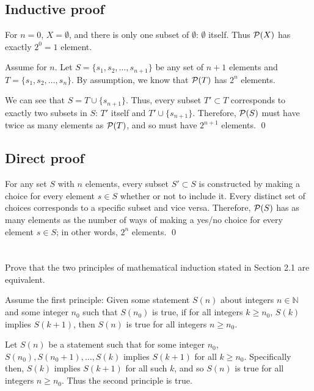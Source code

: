 \subsection{Inductive proof}\label{subsec:2-12-1}

For $n=0$, $X = \emptyset$, and there is only one subset of $\emptyset$: $\emptyset$ itself. Thus $\mathcal{P}(X)$ has exactly $2^0 = 1$ element.

\medskip

Assume for $n$. Let $S = \{s_1, s_2, \dots, s_{n+1}\}$ be any set of $n+1$ elements and $T = \{s_1, s_2, \dots, s_n\}$. By assumption, we know that $\mathcal{P}(T)$ has $2^n$ elements.

We can see that $S = T \cup \{s_{n+1}\}$. Thus, every subset $T' \subset T$ corresponds to exactly two subsets in $S$: $T'$ itself and $T' \cup \{s_{n+1}\}$. Therefore, $\mathcal{P}(S)$ must have twice as many elements as $\mathcal{P}(T)$, and so must have $2^{n+1}$ elements.
\qed

\subsection{Direct proof}\label{subsec:2-12-2}

For any set $S$ with $n$ elements, every subset $S' \subset S$ is constructed by making a choice for every element $s \in S$ whether or not to include it. Every distinct set of choices corresponds to a specific subset and vice versa. Therefore, $\mathcal{P}(S)$ has as many elements as the number of ways of making a yes/no choice for every element $s \in S$; in other words, $2^n$ elements.
\qed
\section{}\label{sec:2-13}

Prove that the two principles of mathematical induction stated in Section 2.1 are equivalent.
\hr

Assume the first principle: Given some statement $S(n)$ about integers $n \in \mathbb{N}$ and some integer $n_0$ such that $S(n_0)$ is true, if for all integers $k \geq n_0$, $S(k)$ implies $S(k+1)$, then $S(n)$ is true for all integers $n \geq n_0$.

Let $S(n)$ be a statement such that for some integer $n_0$, $S(n_0), S(n_0 + 1), \dots, S(k)$ implies $S(k+1)$ for all $k \geq n_0$. Specifically then, $S(k)$ implies $S(k+1)$ for all such $k$, and so $S(n)$ is true for all integers $n \geq n_0$. Thus the second principle is true.

